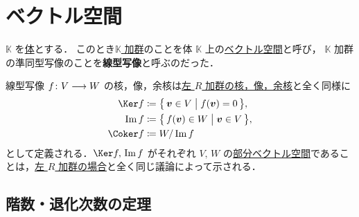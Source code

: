 \documentclass[geometry_main]{subfiles}
\begin{document}



\section{ベクトル空間}

$\mathbb{K}$ を\hyperref[ax:ring]{体}とする．
このとき\hyperref[ax:module]{$\mathbb{K}$ 加群}のことを体 $\mathbb{K}$ 上の\hyperref[ax.vector]{ベクトル空間}と呼び，
$\mathbb{K}$ 加群の準同型写像のことを\textbf{線型写像}と呼ぶのだった．

線型写像 $f \colon V \longrightarrow W$ の核，像，余核は\hyperref[def:ker-module]{左 $R$ 加群の核，像，余核}と全く同様に
\begin{align}
	\Ker f &\coloneqq \bigl\{\, \bm{v} \in V \bigm| f(\bm{v}) = 0 \,\bigr\} , \\
	\Im f &\coloneqq \bigl\{\, f(\bm{v}) \in W \bigm| \bm{v} \in V \,\bigr\} , \\
	\Coker f &\coloneqq W/\Im f
\end{align}
として定義される．$\Ker f,\, \Im f$ がそれぞれ $V,\, W$ の\hyperref[def:submodule]{部分ベクトル空間}であることは，\hyperref[prop:ker-module]{左 $R$ 加群の場合}と全く同じ議論によって示される．

\subsection{階数・退化次数の定理}
\end{document}
